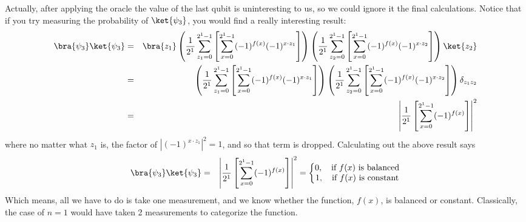 \documentclass[preprint,aps,prd,nofootinbib,superscriptaddress]{revtex4-2}
\begin{document}
%
Actually, after applying the oracle the value of the last qubit is uninteresting to us, so we could ignore it the final calculations. Notice that if you try measuring the probability of $\ket{\psi_3}$, you would find a really interesting result:
%
\begin{eqnarray}
\bra{\psi_3}\ket{\psi_3} &=& \bra{z_1}\left(\frac{1}{2^1} \sum \limits_{z_1=0}^{2^1 - 1} \left[ \sum \limits_{x=0}^{2^1 - 1} (-1)^{f(x)} (-1)^{x \cdot z_1} \right] \right)\left(\frac{1}{2^1} \sum \limits_{z_2=0}^{2^1 - 1} \left[ \sum \limits_{x=0}^{2^1 - 1} (-1)^{f(x)} (-1)^{x \cdot z_2} \right] \right) \ket{z_2}
\nonumber \\
&=& \left(\frac{1}{2^1} \sum \limits_{z_1=0}^{2^1 - 1} \left[ \sum \limits_{x=0}^{2^1 - 1} (-1)^{f(x)} (-1)^{x \cdot z_1} \right] \right)\left(\frac{1}{2^1} \sum \limits_{z_2=0}^{2^1 - 1} \left[ \sum \limits_{x=0}^{2^1 - 1} (-1)^{f(x)} (-1)^{x \cdot z_2} \right] \right) \delta_{z_1 z_2}
\nonumber \\
&=& \left|\frac{1}{2^1} \left[ \sum \limits_{x=0}^{2^1 - 1} (-1)^{f(x)} \right] \right|^2
\end{eqnarray}
%
where no matter what $z_1$ is, the factor of $\left| (-1)^{x \cdot z_1}\right|^2 = 1$, and so that term is dropped. Calculating out the above result says
%
\begin{eqnarray}
\bra{\psi_3}\ket{\psi_3} &=& \left|\frac{1}{2^1} \left[ \sum \limits_{x=0}^{2^1 - 1} (-1)^{f(x)} \right] \right|^2 = \left\lbrace 
\begin{matrix}
0, \quad \text{if } f(x) \text{ is balanced}\\ 
1, \quad \text{if } f(x) \text{ is constant}
\end{matrix}
\right.
\end{eqnarray}
%
Which means, all we have to do is take one measurement, and we know whether the function, $f(x)$, is balanced or constant.  Classically, the case of $n=1$ would have taken 2 measurements to categorize the function. 
%
\end{document}
